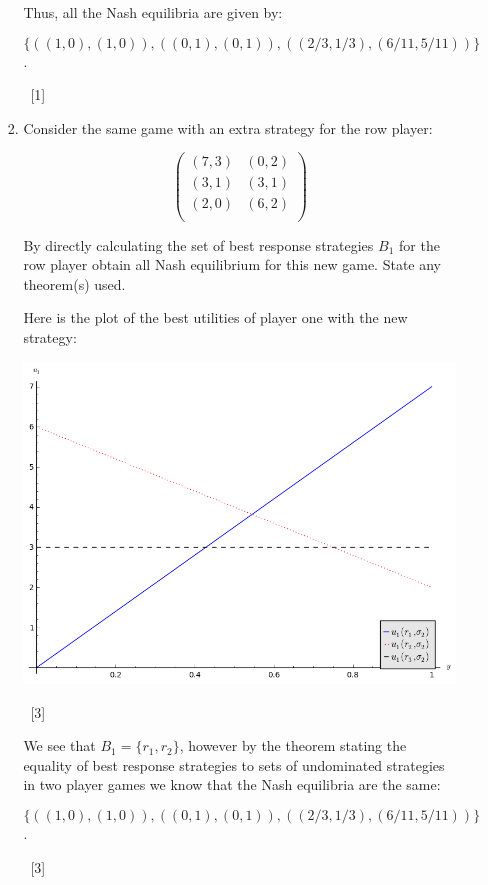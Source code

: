 \documentclass[12pt,a4paper]{article}
\begin{document}
\begin{enumerate}
\begin{enumerate}
\begin{enumerate}
            Thus, all the Nash equilibria are given by:

            \[\{((1,0),(1,0)),((0,1),(0,1)),((2/3,1/3),(6/11,5/11))\}\].

            ~\hfill{[1]}

        \item Consider the same game with an extra strategy for the row player:

            \[\begin{pmatrix}
            (7,3) & (0,2)\\
            (3,1) & (3,1)\\
            (2,0) & (6,2)\\
            \end{pmatrix}\]

            By directly calculating the set of best response strategies \(B_1\) for the row player obtain all Nash equilibrium for this new game.
            State any theorem(s) used.

            Here is the plot of the best utilities of player one with the new strategy:

            \begin{center}
                \includegraphics[width=.5\textwidth]{./plots/2014-2015-plt03.png}
            \end{center}

            ~\hfill{[3]}

            We see that \(B_1=\{r_1,r_2\}\), however by the theorem stating the equality of best response strategies to sets of undominated strategies in two player games we know that the Nash equilibria are the same:

            \[\{((1,0),(1,0)),((0,1),(0,1)),((2/3,1/3),(6/11,5/11))\}\].

            ~\hfill{[3]}

    \end{enumerate}
    \end{enumerate}


\end{enumerate}
\end{document}
